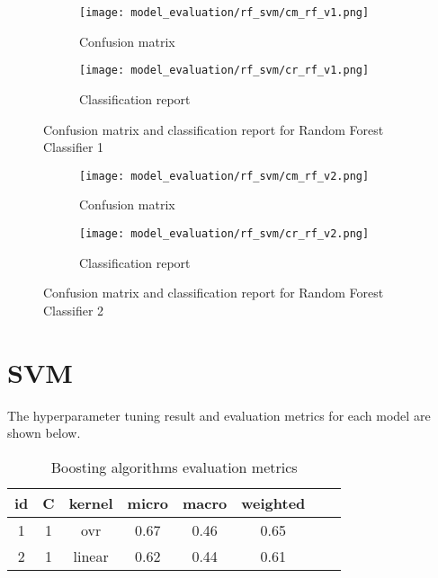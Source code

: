 \begin{figure}[H]
    \centering
    \begin{subfigure}[b]{0.5\textwidth}
        \texttt{[image: model\_evaluation/rf\_svm/cm\_rf\_v1.png]}
        \caption{Confusion matrix}
    \end{subfigure}
    \hfill
    \begin{subfigure}[b]{0.4\textwidth}
        \texttt{[image: model\_evaluation/rf\_svm/cr\_rf\_v1.png]}
        \caption{Classification report}
    \end{subfigure}
    \caption{Confusion matrix and classification report for Random Forest Classifier 1}
\end{figure}

\begin{figure}[H]
    \centering
    \begin{subfigure}[b]{0.5\textwidth}
        \texttt{[image: model\_evaluation/rf\_svm/cm\_rf\_v2.png]}
        \caption{Confusion matrix}
    \end{subfigure}
    \hfill
    \begin{subfigure}[b]{0.4\textwidth}
        \texttt{[image: model\_evaluation/rf\_svm/cr\_rf\_v2.png]}
        \caption{Classification report}
    \end{subfigure}
    \caption{Confusion matrix and classification report for Random Forest Classifier 2}
\end{figure}


\section{SVM}
The hyperparameter tuning result and evaluation metrics for each model are shown below.
\begin{table}[H]
    \begin{center}
        \begin{tabular}{ |c|c|c|c|c|c|c|c| }
            \hline
            id & C & kernel &  micro & macro & weighted \\
            \hline
            1 & 1 & ovr & 0.67 & 0.46  & 0.65     \\
            \hline        
            2 & 1 & linear  & 0.62  & 0.44 & 0.61     \\
            \hline
        \end{tabular}
    \end{center}
    \caption{Boosting algorithms evaluation metrics}
\end{table}


